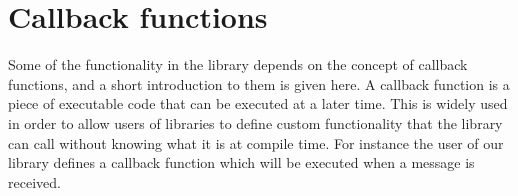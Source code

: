 \section{Callback functions}
Some of the functionality in the library depends on the concept of callback functions, and a short introduction to them is given here.
A callback function is a piece of executable code that can be executed at a later time. This is widely used in order to allow users of libraries to define custom functionality that the library can call without knowing what it is at compile time. For instance the user of our library defines a callback function which will be executed when a message is received.
